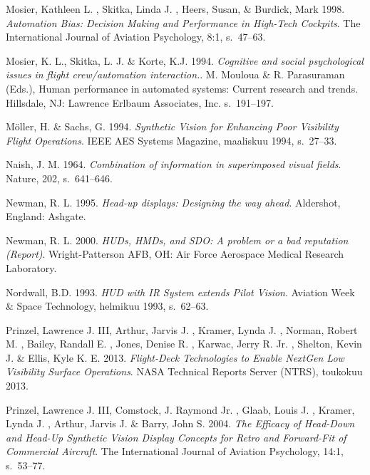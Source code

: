 \documentclass[utf8,bachelor,manualbib]{gradu3}
\begin{document}
\begin{thebibliography}{}
Mosier, Kathleen L. , Skitka, Linda J. , Heers, Susan, \& Burdick, Mark 1998.
\textit{Automation Bias: Decision Making and Performance in High-Tech Cockpits}.
The International Journal of Aviation Psychology, 8:1, s.~47--63.

Mosier, K. L., Skitka, L. J. \& Korte, K.J. 1994.
\textit{Cognitive and social psychological issues in flight crew/automation interaction.}.
M. Mouloua \& R. Parasuraman (Eds.), Human performance in automated systems: Current research and trends. Hillsdale, NJ: Lawrence Erlbaum Associates, Inc. s.~191--197.

Möller, H. \& Sachs, G. 1994.
\textit{Synthetic Vision for Enhancing Poor Visibility Flight Operations}.
IEEE AES Systems Magazine, maaliskuu 1994, s.~27--33.

Naish, J. M. 1964.
\textit{Combination of information in superimposed visual fields}.
Nature, 202, s.~641--646.

Newman, R. L. 1995.
\textit{Head-up displays: Designing the way ahead}.
Aldershot, England: Ashgate.

Newman, R. L. 2000.
\textit{HUDs, HMDs, and SDO: A problem or a bad reputation (Report)}.
Wright-Patterson AFB, OH: Air Force Aerospace Medical Research Laboratory.

Nordwall, B.D. 1993.
\textit{HUD with IR System extends Pilot Vision}.
Aviation Week \& Space Technology, helmikuu 1993, s.~62--63.

Prinzel, Lawrence J. III, Arthur, Jarvis J. , Kramer, Lynda J. ,  Norman, Robert M. , Bailey, Randall E. , Jones, Denise R. ,  Karwac, Jerry R. Jr. , Shelton, Kevin J. \& Ellis, Kyle K. E. 2013.
\textit{Flight-Deck Technologies to Enable NextGen Low Visibility Surface Operations}.
NASA Technical Reports Server (NTRS), toukokuu 2013.

Prinzel, Lawrence J. III, Comstock, J. Raymond Jr. , Glaab, Louis J. , Kramer, Lynda J. , Arthur, Jarvis J. \& Barry, John S. 2004.
\textit{The Efficacy of Head-Down and Head-Up Synthetic Vision Display Concepts for Retro and Forward-Fit of Commercial Aircraft}.
The International Journal of Aviation Psychology, 14:1, s.~53--77.


\end{thebibliography}
\end{document}
